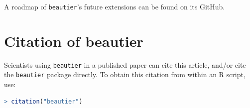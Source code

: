\documentclass{article}
\begin{document}
A roadmap of \verb;beautier;'s future extensions can be found on its GitHub.

\section{Citation of beautier}

Scientists using \verb;beautier; in a published paper can cite this
article, and/or cite the \verb;beautier; package 
directly. To obtain this citation from within an R script, use:

\begin{lstlisting}[language=R]
> citation("beautier")
\end{lstlisting}




\begin{thebibliography}{}

\end{thebibliography}
\end{document}
